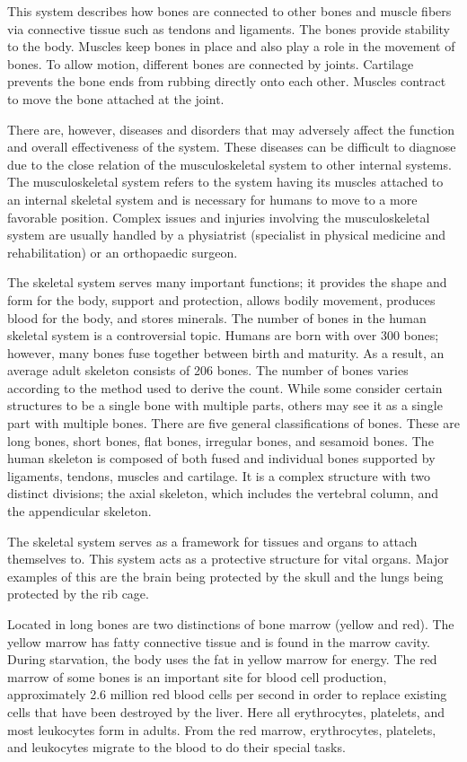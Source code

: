 This system describes how bones are connected to other bones and muscle fibers via connective tissue such as tendons and ligaments. The bones provide stability to the body. Muscles keep bones in place and also play a role in the movement of bones. To allow motion, different bones are connected by joints. Cartilage prevents the bone ends from rubbing directly onto each other. Muscles contract to move the bone attached at the joint.

There are, however, diseases and disorders that may adversely affect the function and overall effectiveness of the system. These diseases can be difficult to diagnose due to the close relation of the musculoskeletal system to other internal systems. The musculoskeletal system refers to the system having its muscles attached to an internal skeletal system and is necessary for humans to move to a more favorable position. Complex issues and injuries involving the musculoskeletal system are usually handled by a physiatrist (specialist in physical medicine and rehabilitation) or an orthopaedic surgeon.

The skeletal system serves many important functions; it provides the shape and form for the body, support and protection, allows bodily movement, produces blood for the body, and stores minerals. The number of bones in the human skeletal system is a controversial topic. Humans are born with over 300 bones; however, many bones fuse together between birth and maturity. As a result, an average adult skeleton consists of 206 bones. The number of bones varies according to the method used to derive the count. While some consider certain structures to be a single bone with multiple parts, others may see it as a single part with multiple bones. There are five general classifications of bones. These are long bones, short bones, flat bones, irregular bones, and sesamoid bones. The human skeleton is composed of both fused and individual bones supported by ligaments, tendons, muscles and cartilage. It is a complex structure with two distinct divisions; the axial skeleton, which includes the vertebral column, and the appendicular skeleton.

The skeletal system serves as a framework for tissues and organs to attach themselves to. This system acts as a protective structure for vital organs. Major examples of this are the brain being protected by the skull and the lungs being protected by the rib cage.

Located in long bones are two distinctions of bone marrow (yellow and red). The yellow marrow has fatty connective tissue and is found in the marrow cavity. During starvation, the body uses the fat in yellow marrow for energy. The red marrow of some bones is an important site for blood cell production, approximately 2.6 million red blood cells per second in order to replace existing cells that have been destroyed by the liver. Here all erythrocytes, platelets, and most leukocytes form in adults. From the red marrow, erythrocytes, platelets, and leukocytes migrate to the blood to do their special tasks.


